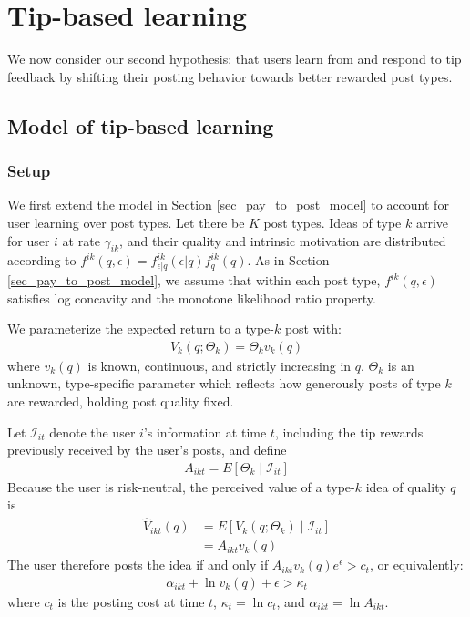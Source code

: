 \section{Tip-based learning}\label{sec_v4v}

We now consider our second hypothesis: that users learn from and respond to tip feedback by shifting their posting behavior towards better rewarded post types.

\subsection{Model of tip-based learning}

\subsubsection*{Setup}

We first extend the model in Section \ref{sec_pay_to_post_model} to account for user learning over post types. Let there be $K$ post types. Ideas of type $k$ arrive for user $i$ at rate $\gamma_{ik}$, and their quality and intrinsic motivation are distributed according to $f^{ik}(q, \epsilon) = f^{ik}_{\epsilon|q} (\epsilon | q) f^{ik}_q(q)$. As in Section \ref{sec_pay_to_post_model}, we assume that within each post type, $f^{ik}(q,\epsilon)$ satisfies log concavity and the monotone likelihood ratio property.

We parameterize the expected return to a type-$k$ post with:
\begin{align}
V_k(q; \Theta_k) = \Theta_k v_k(q)  \label{eq_type_return}
\end{align}
where $v_k(q)$ is known, continuous, and strictly increasing in $q$. $\Theta_k$ is an unknown, type-specific parameter which reflects how generously posts of type $k$ are rewarded, holding post quality fixed. 

Let $\mathcal{I}_{it}$ denote the user $i$'s information at time $t$, including the tip rewards previously received by the user's posts, and define
\begin{align}
A_{ikt} = E \left[ \Theta_k \mid \mathcal{I}_{it} \right] \label{eq_Mkt}
\end{align}
Because the user is risk-neutral, the perceived value of a type-$k$ idea of quality $q$ is
\begin{align}
\widehat{V}_{ikt}(q) &= E\left[ V_k(q;\Theta_k) \mid \mathcal{I}_{it} \right] \nonumber \\
&= A_{ikt} v_k(q)
\end{align}
The user therefore posts the idea if and only if $A_{ikt} v_k(q) e^{\epsilon} > c_t$, or equivalently:
\begin{align}
\alpha_{ikt} + \ln v_{k}(q) + \epsilon > \kappa_t
\end{align}
where $c_t$ is the posting cost at time $t$, $\kappa_t = \ln c_t$, and $\alpha_{ikt} = \ln A_{ikt}$.

